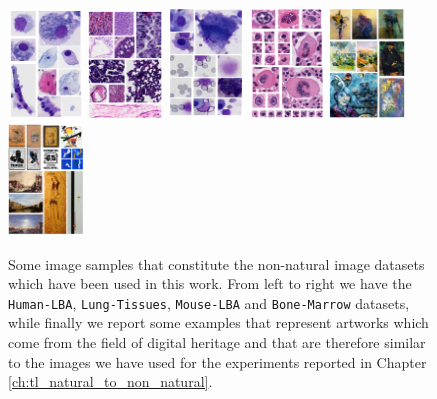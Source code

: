 \begin{figure}
  \centering
   \includegraphics[width=2cm,height=\textheight,keepaspectratio]{./Images/Chapter05/lba.pdf}%
  \includegraphics[width=2cm,height=\textheight,keepaspectratio]{./Images/Chapter05/tissus.pdf}%
  \includegraphics[width=2cm,height=\textheight,keepaspectratio]{./Images/Chapter05/mouse_lba.pdf}%
    \includegraphics[width=2cm,height=\textheight,keepaspectratio]{./Images/Chapter05/bonemarrow.pdf}%
  \includegraphics[width=2cm,height=\textheight,keepaspectratio]{./Images/Chapter05/artist.pdf}%
  \includegraphics[width=2cm,height=\textheight,keepaspectratio]{./Images/Chapter05/type.pdf}%
\caption{Some image samples that constitute the non-natural image datasets which have been used in this work.
From left to right we have the \texttt{Human-LBA}, \texttt{Lung-Tissues}, \texttt{Mouse-LBA} and \texttt{Bone-Marrow} datasets, while finally we report some examples that represent artworks which come from the field of digital heritage and that are therefore similar to the images we have used for the experiments reported in Chapter \ref{ch:tl_natural_to_non_natural}.}
\label{fig:dataset_images}
\end{figure}

